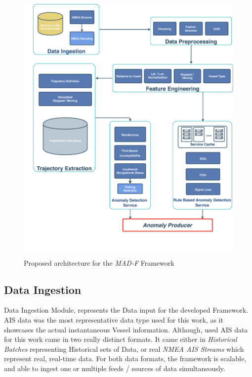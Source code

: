 \begin{figure}[H]
\centering
\includegraphics[width=\textwidth]{figures/Ch3/Framework.pdf}
\caption{Proposed architecture for the \emph{MAD-F} Framework}
\label{fig:Framework}
\end{figure}

\subsection{Data Ingestion}
\label{subsection: Data Ingestion}
Data Ingestion Module, represents the Data input for the developed Framework. AIS data was the most representative data type used for this work, as it showcases the actual instantaneous Vessel information.
Although, used AIS data for this work came in two really distinct formats. It came either in \emph{Historical Batches} representing Historical sets of Data, or real \emph{NMEA AIS Streams} which represent real, real-time data. For both data formats, the framework is scalable, and able to ingest one or multiple feeds / sources of data simultaneously.


